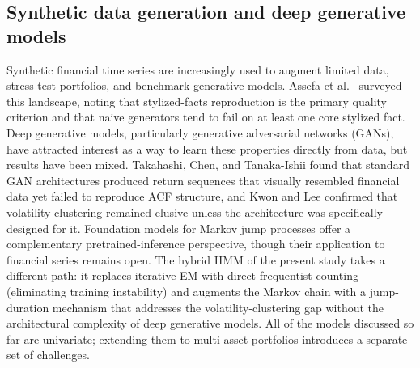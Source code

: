 \subsection{Synthetic data generation and deep generative models}
Synthetic financial time series are increasingly used to augment limited data, stress test portfolios, and benchmark generative models. Assefa et al.\ \cite{assefa_generating_2021} surveyed this landscape, noting that stylized-facts reproduction is the primary quality criterion and that naive generators tend to fail on at least one core stylized fact. Deep generative models, particularly generative adversarial networks (GANs), have attracted interest as a way to learn these properties directly from data, but results have been mixed. Takahashi, Chen, and Tanaka-Ishii \cite{takahashi_2019} found that standard GAN architectures produced return sequences that visually resembled financial data yet failed to reproduce ACF structure, and Kwon and Lee \cite{kwon_can_2024} confirmed that volatility clustering remained elusive unless the architecture was specifically designed for it. Foundation models for Markov jump processes \cite{berghaus_foundation_2025} offer a complementary pretrained-inference perspective, though their application to financial series remains open. The hybrid HMM of the present study takes a different path: it replaces iterative EM with direct frequentist counting (eliminating training instability) and augments the Markov chain with a jump-duration mechanism that addresses the volatility-clustering gap without the architectural complexity of deep generative models. All of the models discussed so far are univariate; extending them to multi-asset portfolios introduces a separate set of challenges.

